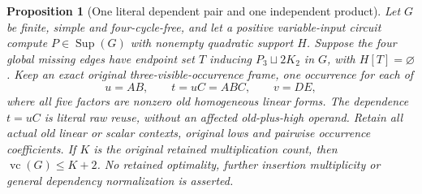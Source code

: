 \documentclass[11pt]{article}
\newcommand{\Sup}{\operatorname{Sup}}
\newcommand{\vc}{\operatorname{vc}}
\newtheorem{proposition}[theorem]{Proposition}
\theoremstyle{definition}
\theoremstyle{remark}
\begin{document}
\begin{proposition}[One literal dependent pair and one independent product]\label{prop:mixedrawthreevisible}
Let $G$ be finite, simple and four-cycle-free, and let a positive variable-input circuit compute $P\in\Sup(G)$ with nonempty quadratic support $H$. Suppose the four global missing edges have endpoint set $T$ inducing $P_3\sqcup2K_2$ in $G$, with $H[T]=\varnothing$. Keep an exact original three-visible-occurrence frame, one occurrence for each of
\[
 u=AB,\qquad t=uC=ABC,\qquad v=DE,
\]
where all five factors are nonzero old homogeneous linear forms. The dependence $t=uC$ is literal raw reuse, without an affected old-plus-high operand. Retain all actual old linear or scalar contexts, original lows and pairwise occurrence coefficients. If $K$ is the original retained multiplication count, then $\vc(G)\le K+2$. No retained optimality, further insertion multiplicity or general dependency normalization is asserted.
\end{proposition}
\end{document}
